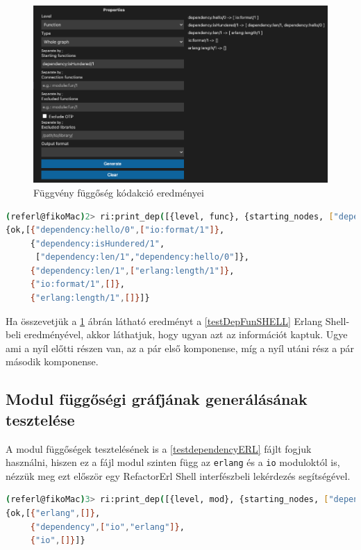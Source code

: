 \begin{figure}[H]
  \centering
  \includegraphics[width=\linewidth]{images/testCases/funDep.png}
  \caption{Függvény függőség kódakció eredményei}
  \label{fig:funDep}
\end{figure}

\newpage

\lstset{caption=Függvány függőség lekérdezésének eredménye, label=testDepFunSHELL}
\begin{lstlisting}[language={sh}]  
(referl@fikoMac)2> ri:print_dep([{level, func}, {starting_nodes, ["dependency:isHundered/1"]}]).
{ok,[{"dependency:hello/0",["io:format/1"]},
     {"dependency:isHundered/1",
      ["dependency:len/1","dependency:hello/0"]},
     {"dependency:len/1",["erlang:length/1"]},
     {"io:format/1",[]},
     {"erlang:length/1",[]}]}
\end{lstlisting}


Ha összevetjük a \ref{fig:funDep} ábrán látható eredményt a \ref{testDepFunSHELL} Erlang Shell-beli eredményével, akkor láthatjuk, hogy ugyan azt az információt kaptuk. Ugye ami a nyíl előtti részen van, az a pár első komponense, míg a nyíl utáni rész a pár második komponense.


\subsection{Modul függőségi gráfjának generálásának tesztelése}

A modul függőségek tesztelésének is a \ref{testdependencyERL} fájlt fogjuk használni, hiszen ez a fájl modul szinten függ az \lstinline{erlang} és a \lstinline{io} moduloktól is, nézzük meg ezt először egy RefactorErl Shell interfészbeli lekérdezés segítségével.

\lstset{caption=Függvány függőség lekérdezésének eredménye, label=testDepFunSHELL2} 
\begin{lstlisting}[language={sh}]  
(referl@fikoMac)3> ri:print_dep([{level, mod}, {starting_nodes, ["dependency"]}]).              
{ok,[{"erlang",[]},
     {"dependency",["io","erlang"]},
     {"io",[]}]}
\end{lstlisting}


